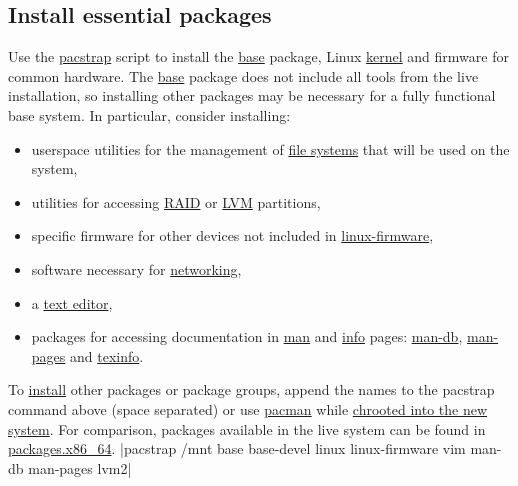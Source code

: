 \documentclass[11pt,A4]{article}
\newcommand{\linecode}[1]{ \mint[fontsize=\small,bgcolor=ArchCode,frame=single]{bash}|#1|}
\begin{document}
\subsection{Install essential packages}
Use the \href{https://projects.archlinux.org/arch-install-scripts.git/tree/pacstrap.in}{pacstrap} script to install the \href{https://www.archlinux.org/packages/?name=base}{base} package, Linux \href{https://wiki.archlinux.org/index.php/Kernel}{kernel} and firmware for common hardware.
The \href{https://www.archlinux.org/packages/?name=base}{base} package does not include all tools from the live installation, so installing other packages may be necessary for a fully functional base system. In particular, consider installing:
\begin{itemize}
    \item userspace utilities for the management of \href{https://wiki.archlinux.org/index.php/File_systems}{file systems} that will be used on the system,
    \item utilities for accessing \href{https://wiki.archlinux.org/index.php/RAID}{RAID} or \href{https://wiki.archlinux.org/index.php/LVM}{LVM} partitions,
    \item specific firmware for other devices not included in \href{https://www.archlinux.org/packages/?name=linux-firmware}{linux-firmware},
    \item software necessary for \href{https://wiki.archlinux.org/index.php/Networking}{networking},
    \item a \href{https://wiki.archlinux.org/index.php/Text_editor}{text editor},
\item packages for accessing documentation in \href{https://wiki.archlinux.org/index.php/Man}{man} and \href{https://wiki.archlinux.org/index.php/Info}{info} pages: \href{https://www.archlinux.org/packages/?name=man-db}{man-db}, \href{https://www.archlinux.org/packages/?name=man-pages}{man-pages} and \href{https://www.archlinux.org/packages/?name=texinfo}{texinfo}.
\end{itemize}
    
\noindent To \href{https://wiki.archlinux.org/index.php/Install}{install} other packages or package groups, append the names to the pacstrap command above (space separated) or use \href{https://wiki.archlinux.org/index.php/Pacman}{pacman} while \href{https://wiki.archlinux.org/index.php/Installation_guide#Chroot}{chrooted into the new system}. For comparison, packages available in the live system can be found in \href{https://projects.archlinux.org/archiso.git/tree/configs/releng/packages.x86_64}{packages.x86\_64}.
\linecode{pacstrap /mnt base base-devel linux linux-firmware vim man-db man-pages lvm2}
\end{document}
